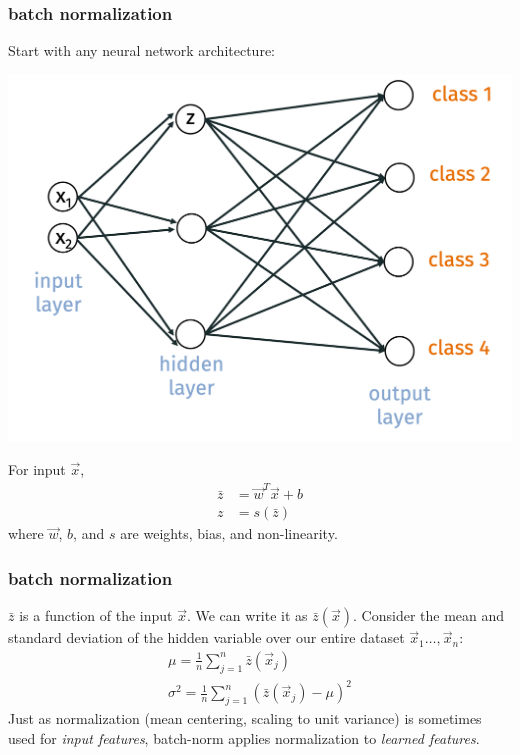 \documentclass[handout,compress]{beamer}
\begin{document}
\begin{frame}
	\frametitle{batch normalization}
	\small Start with any neural network architecture:
	\begin{center}
		\includegraphics[width=.6\textwidth]{original_net.png}
	\end{center}
\vspace{-1em}
For input $\vec{x}$,
\begin{align*}
\bar{z} &= \vec{w}^T\vec{x} + b \\
z &= s(\bar{z})
\end{align*}
where $\vec{w}$, $b$, and $s$ are weights, bias, and non-linearity.
\end{frame}

\begin{frame}
	\frametitle{batch normalization}
	$\bar{z}$ is a function of the input $\vec{x}$. We can write it as $\bar{z}(\vec{x})$. Consider the mean and standard deviation of the hidden variable over our entire dataset $\vec{x}_1\ldots, \vec{x}_n$: 
	\begin{align*}
		\mu = \frac{1}{n}\sum_{j=1}^n \bar{z}(\vec{x}_j)\\
		\sigma^2 = \frac{1}{n}\sum_{j=1}^n (\bar{z}(\vec{x}_j) - \mu)^2
	\end{align*}
	Just as normalization (mean centering, scaling to unit variance) is sometimes used for \emph{input features}, batch-norm applies normalization to \emph{learned features}.
\end{frame}
\end{document}
